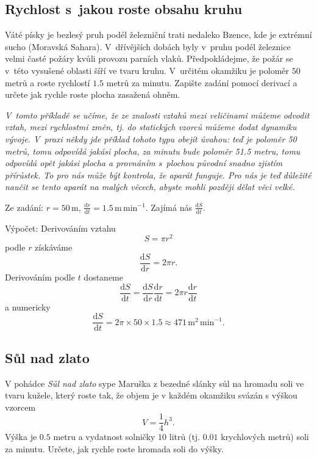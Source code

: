 \subsection{Rychlost s jakou roste obsahu kruhu}  Váté písky je bezlesý
pruh podél železniční trati nedaleko Bzence, kde je extrémní sucho
(Moravská Sahara). V dřívějších dobách byly v pruhu podél železnice velmi časté
požáry kvůli provozu parních vlaků. Předpokládejme, že požár se v této
vysušené oblasti šíří ve tvaru kruhu. V určitém okamžiku je poloměr $50$
metrů a roste rychlostí $1.5$ metrů za minutu. Zapište zadání pomocí
derivací a určete jak rychle roste plocha zasažená ohněm.

\textit{V tomto příkladě se učíme, že ze znalosti vztahů mezi veličinami můžeme odvodit vztah, mezi rychlostmi změn, tj. do statických vzorců můžeme dodat dynamiku vývoje. V praxi někdy jde příklad tohoto typu obejít úvahou: teď je poloměr 50 metrů, tomu odpovídá jakási plocha, za minutu  bude poloměr 51.5 metru, tomu odpovídá opět jakási plocha a provnáním s plochou původní snadno zjistím přírůstek. To pro nás může být kontrola, že aparát funguje. Pro nás je teď důležité naučit se tento aparát na malých věcech, abyste mohli později dělat věci velké.}

\reseni Ze zadání: $r=50\,\mathrm{m}$, $\frac {\mathrm dr}{\mathrm dt}=1.5\,\text{m}\,\text{min}^{-1}$. Zajímá nás $\frac{\mathrm dS}{\mathrm dt}$.

Výpočet: Derivováním vztahu $$S=\pi r^2$$ podle $r$ získáváme $$\frac {\mathrm dS}{\mathrm dr}=2\pi r.$$ Derivováním podle $t$ dostaneme
$$\frac{\mathrm dS}{\mathrm dt} =
\frac{\mathrm dS}{\mathrm dr}
\frac{\mathrm dr}{\mathrm dt}=
2\pi r \frac{\mathrm dr}{\mathrm dt}$$
a numericky
$$\frac{\mathrm dS}{\mathrm dt} = 2\pi \times 50 \times 1.5 \approx 471 \,\mathrm{m}^2\,\text{min}^{-1}.$$
\konec


\stranka
{}
\subsection{Sůl nad zlato}
V pohádce \textit{Sůl nad zlato} sype Maruška z bezedné slánky sůl na hromadu soli ve tvaru kužele, který roste tak, že objem je v každém okamžiku svázán s výškou vzorcem $$V=\frac 14h^3.$$ Výška je $0.5$ metru a vydatnost solničky $10$ litrů (tj. $0.01$ krychlových metrů) soli za minutu. Určete, jak rychle roste hromada soli do výšky.

